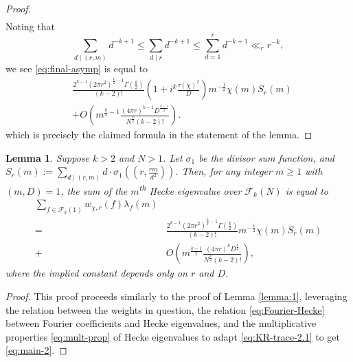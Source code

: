 \documentclass[12pt, reqno,oneside]{amsart}
\theoremstyle{plain}
\newtheorem{lemma}[theorem]{Lemma}
\theoremstyle{definition}
\theoremstyle{remark}
\theoremstyle{plain}
\numberwithin{equation}{section}
\begin{document}
\begin{proof}
\begin{align}
\end{align}
Noting that 
\begin{equation}
\sum_{d \mid (r,m)} d^{-k+1} \leq \sum_{d \mid r} d^{-k+1} \leq \sum_{d=1}^r d^{-k+1} \ll_r r^{-k},
\end{equation}
we see \eqref{eq:final-asymp} is equal to
\begin{align}\nonumber
&\frac{2^{k-1}(2\pi r^2)^{\frac{k}{2}-1}\Gamma\left(\frac{k}{2}\right)}{(k-2)!}\left(1+i^k\frac{\tau(\chi)^2}{D}\right)m^{-\frac{1}{2}}\chi(m) S_r(m)\\
&+O\left(m^{\frac{k}{2}-1}\frac{(4\pi r)^{k-1}D^{\frac{k-1}{2}}}{N^{\frac{k}{2}}(k-2)!}\right).
\end{align}
which is precisely the claimed formula in the statement of the lemma. 
\end{proof}

\begin{lemma}\label{lemma:1.2}
Suppose $k>2$ and $N>1$. Let $\sigma_1$ be the divisor sum function, and $S_r(m) := \sum_{d \mid (r,m)}d \cdot \sigma_1\left(\left(r,\frac{rm}{d^2}\right)\right)$. Then, for any integer $m\geq1$ with $(m,D) = 1$, the sum of the $m$\textsuperscript{th} Hecke eigenvalue over $\mathcal{F}_k(N)$ is equal to
\begin{align}\nonumber
\sum_{f\in\mathcal{F}_k(1)}w_{\chi,r}(f)\lambda_f(m) & \\
\nonumber
= \ & \frac{2^{k-1}(2\pi r^2)^{\frac{k}{2}-1}\Gamma\left(\frac{k}{2}\right)}{(k-2)!} m^{-\frac{1}{2}} \chi(m) S_r(m)\\
\label{eq:main-2}
+ \ & O\left(m^{\frac{k-1}{2}}\frac{(4\pi r)^{k}D^{\frac{k}{2}}}{N^{\frac{k}{2}}(k-2)!}\right),
\end{align}
where the implied constant depends only on $r$ and $D$. 
\end{lemma}
\begin{proof}
This proof proceeds similarly to the proof of Lemma \ref{lemma:1}, leveraging the relation between the weights in question, the relation \eqref{eq:Fourier-Hecke} between Fourier coefficients and Hecke eigenvalues, and the multiplicative properties \eqref{eq:mult-prop} of Hecke eigenvalues to adapt \eqref{eq:KR-trace-2.1} to get \eqref{eq:main-2}.
\end{proof}
\end{document}
